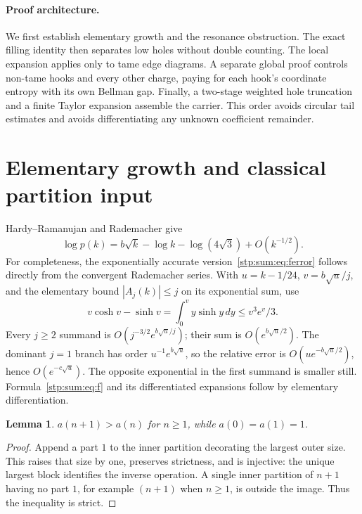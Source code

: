\documentclass[11pt]{article}
\newtheorem{lemma}[theorem]{Lemma}
\theoremstyle{remark}\newtheorem{remark}[theorem]{Remark}
\begin{document}
\paragraph{Proof architecture.}
We first establish elementary growth and the resonance obstruction. The exact filling identity then separates low holes without double counting. The local expansion applies only to tame edge diagrams. A separate global proof controls non-tame hooks and every other charge, paying for each hook's coordinate entropy with its own Bellman gap. Finally, a two-stage weighted hole truncation and a finite Taylor expansion assemble the carrier. This order avoids circular tail estimates and avoids differentiating any unknown coefficient remainder.

\section{Elementary growth and classical partition input}
\label{stp:sum:sec:elementary}
Hardy--Ramanujan and Rademacher give~\cite{dlmfpart}
\begin{equation}\label{stp:sum:eq:logp}
 \log p(k)=b\sqrt k-\log k-\log(4\sqrt3)+O(k^{-1/2}).
\end{equation}
For completeness, the exponentially accurate version~\eqref{stp:sum:eq:ferror} follows directly from the convergent Rademacher series. With $u=k-1/24$, $v=b\sqrt u/j$, and the elementary bound $|A_j(k)|\le j$ on its exponential sum, use
\[
 v\cosh v-\sinh v=\int_0^v y\sinh y\,dy\le v^3e^v/3.
\]
Every $j\ge2$ summand is $O(j^{-3/2}e^{b\sqrt u/j})$; their sum is $O(e^{b\sqrt u/2})$. The dominant $j=1$ branch has order $u^{-1}e^{b\sqrt u}$, so the relative error is $O(ue^{-b\sqrt u/2})$, hence $O(e^{-c\sqrt u})$. The opposite exponential in the first summand is smaller still. Formula~\eqref{stp:sum:eq:f} and its differentiated expansions follow by elementary differentiation.

\begin{lemma}\label{stp:sum:lem:monotone}
$a(n+1)>a(n)$ for $n\ge1$, while $a(0)=a(1)=1$.
\end{lemma}
\begin{proof}
Append a part $1$ to the inner partition decorating the largest outer size. This raises that size by one, preserves strictness, and is injective: the unique largest block identifies the inverse operation. A single inner partition of $n+1$ having no part $1$, for example $(n+1)$ when $n\ge1$, is outside the image. Thus the inequality is strict.
\end{proof}
\end{document}
